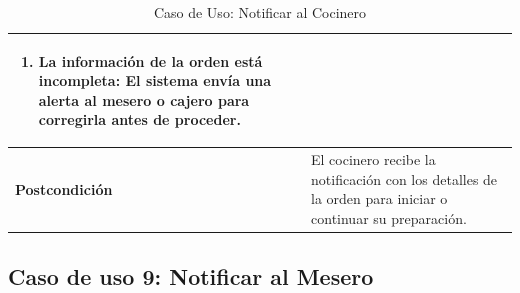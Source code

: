 \documentclass{article}
\begin{document}
\begin{table}[H]
\begin{tabular}{|p{4cm}|p{11cm}|}
\begin{enumerate}
        \item La información de la orden está incompleta: El sistema envía una alerta al mesero o cajero para corregirla antes de proceder.
    \end{enumerate} \\ \hline
    \textbf{Postcondición}      & El cocinero recibe la notificación con los detalles de la orden para iniciar o continuar su preparación. \\ \hline
    \end{tabular}
    \caption{Caso de Uso: Notificar al Cocinero}
    \label{tab:notificar_cocinero}
\end{table}
    

\subsection{Caso de uso 9: Notificar al Mesero}
\end{document}
